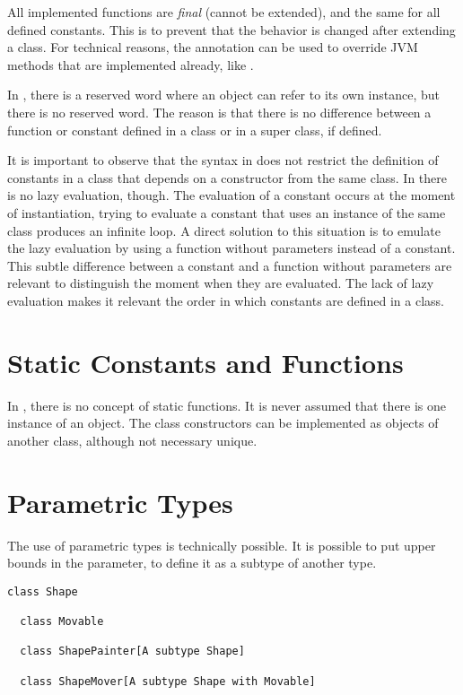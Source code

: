 All implemented functions are \textit{final} (cannot be extended), and the same for all defined constants.
This is to prevent that the behavior is changed after extending a class.
For technical reasons, the annotation \soverride can be used to override JVM methods that are implemented already, like .

In \Soda, there is a \sthis reserved word where an object can refer to its own instance, but there is no  reserved word.
The reason is that there is no difference between a function or constant defined in a class or in a super class, if defined.

It is important to observe that the syntax in \Soda does not restrict the definition of constants in a class that depends on a constructor from the same class.
In \Soda there is no lazy evaluation, though.
The evaluation of a constant occurs at the moment of instantiation, trying to evaluate a constant that uses an instance of the same class produces an infinite loop.
A direct solution to this situation is to emulate the lazy evaluation by using a function without parameters instead of a constant.
This subtle difference between a constant and a function without parameters are relevant to distinguish the moment when they are evaluated.
The lack of lazy evaluation makes it relevant the order in which constants are defined in a class.


\section{Static Constants and Functions}

In \Soda, there is no concept of static functions.
It is never assumed that there is one instance of an object.
The class constructors can be implemented as objects of another class, although not necessary unique.


\section{Parametric Types}

The use of parametric types is technically possible.
It is possible to put upper bounds in the parameter, to define it as a subtype of another type.

\begin{lstlisting}[label={lst:exampleUpperBoundParameter}]
  class Shape

  class Movable

  class ShapePainter[A subtype Shape]

  class ShapeMover[A subtype Shape with Movable]
\end{lstlisting}

